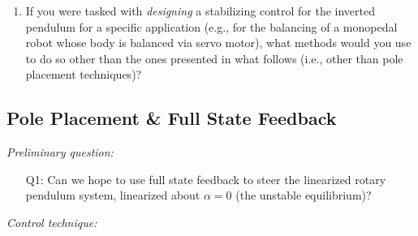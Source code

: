 \documentclass[12pt]{report}
\newcommand\drew[1]{\textcolor{red}{#1}}
\begin{document}
\begin{enumerate}
    \item If you were tasked with \emph{designing} a stabilizing control for the inverted pendulum for a specific application (e.g., for the balancing of a monopedal robot whose body is balanced via servo motor), what methods would you use to do so other than the ones presented in what follows (i.e., other than pole placement techniques)?
\end{enumerate}
\subsection{Pole Placement \& Full State Feedback}\label{subsection:lab3_feedback}
\emph{Preliminary question:}
\begin{enumerate}
    \item[Q1:] Can we hope to use full state feedback to steer the linearized rotary pendulum system, linearized about $\alpha = 0$ (the unstable equilibrium)?\\
\end{enumerate}
\emph{Control technique:}
\end{document}
